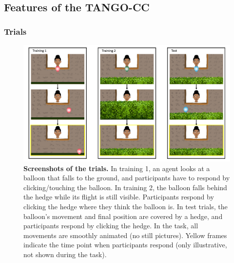 \documentclass[
  man,floatsintext]{apa7}
\begin{document}
\subsection{Features of the TANGO-CC}\label{features-of-the-tango-cc}

\subsubsection{Trials}\label{trials}



\begin{figure}

{\centering \includegraphics[width=1\linewidth]{../figures/tango-cc-procedure} 

}

\caption{\textbf{Screenshots of the trials.} In training 1, an agent looks at a balloon that falls to the ground, and participants have to respond by clicking/touching the balloon. In training 2, the balloon falls behind the hedge while its flight is still visible. Participants respond by clicking the hedge where they think the balloon is. In test trials, the balloon's movement and final position are covered by a hedge, and participants respond by clicking the hedge. In the task, all movements are smoothly animated (no still pictures). Yellow frames indicate the time point when participants respond (only illustrative, not shown during the task).}\label{fig:fig1}
\end{figure}
\end{document}
